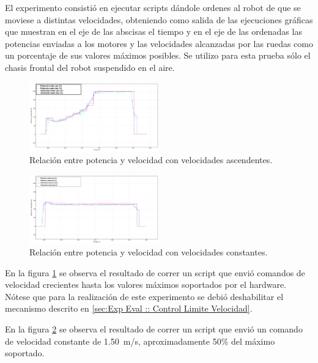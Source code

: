 \documentclass[withindex,glossary]{cam-thesis}
\begin{document}
El experimento consistió en ejecutar scripts dándole ordenes al robot de que se moviese a distintas velocidades, obteniendo como salida de las ejecuciones gráficas que muestran en el eje de las abscisas el tiempo y en el eje de las ordenadas las potencias enviadas a los motores y las velocidades alcanzadas por las ruedas como un porcentaje de sus valores máximos posibles. Se utilizo para esta prueba sólo el chasis frontal del robot suspendido en el aire.

\begin{figure}[H]
\centering
\includegraphics[width=0.5\textwidth]{images/Plot_IncreasingPowvsSpeed}
\caption[Prueba de Relación entre Potencia y Velocidad 1]{Relación entre potencia y velocidad con velocidades ascendentes.}
\label{fig:plotIncreasingPowvsSpeed}
\end{figure}

\begin{figure}[H]
  \centering
  \includegraphics[width=0.5\textwidth]{images/Plot_ConstantPowvsSpeed}
  \caption[Prueba de Relación entre Potencia y Velocidad 2]{Relación entre potencia y velocidad con velocidades constantes.}
  \label{fig:plotConstantPowvsSpeed}
\end{figure}

En la figura \ref{fig:plotIncreasingPowvsSpeed} se observa el resultado de correr un script que envió comandos de velocidad crecientes hasta los valores máximos soportados por el hardware. Nótese que para la realización de este experimento se debió deshabilitar el mecanismo descrito en \ref{sec:Exp Eval :: Control Limite Velocidad}.

En la figura \ref{fig:plotConstantPowvsSpeed} se observa el resultado de correr un script que envió un comando de velocidad constante de \SI{1.50}{\metre/\second}, aproximadamente 50\% del máximo soportado.
\end{document}
